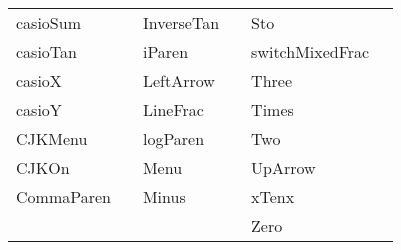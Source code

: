 \documentclass[12pt]{article}
\newenvironment{fonttable}{\begin{center}}{\end{center}}
\begin{document}
\begin{fonttable}
\begin{tabular}{LCLCLC}
casioSum 	&	 \casioSum 	&	InverseTan 	&	 \InverseTan 	&	Sto 	&	 \Sto 	\\
casioTan 	&	 \casioTan 	&	iParen 	&	 \iParen 	&	switchMixedFrac 	&	 \switchMixedFrac 	\\
casioX 	&	 \casioX 	&	LeftArrow 	&	 \LeftArrow 	&	Three 	&	 \Three 	\\
casioY 	&	 \casioY 	&	LineFrac 	&	 \LineFrac 	&	Times 	&	 \Times 	\\
CJKMenu 	&	 \CJKMenu	&	logParen 	&	 \logParen 	&	Two 	&	 \Two 	\\
CJKOn 	&	 \CJKOn 	&	Menu 	&	 \Menu 	&	UpArrow 	&	 \UpArrow 	\\
CommaParen 	&	 \CommaParen 	&	Minus 	&	 \Minus 	&	xTenx 	&	 \xTenx 	\\
 &							Zero 	&	 \Zero 	\\
\end{tabular}
\end{fonttable}
\end{document}
